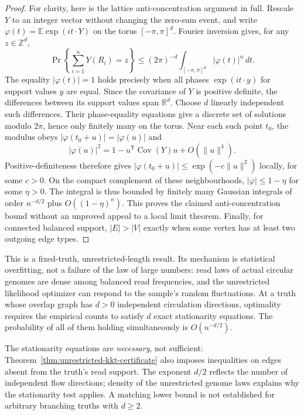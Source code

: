 \begin{proof}
For clarity, here is the lattice anti-concentration argument in
full. Rescale $Y$ to an integer vector without changing the
zero-sum event, and write
$\varphi(t)=\mathbb E\exp(i t\cdot Y)$ on the torus
$[-\pi,\pi]^d$. Fourier inversion gives, for any
$z\in\mathbb Z^d$,
\[
 \Pr\!\left\{\sum_{i=1}^n Y(R_i)=z\right\}
 \le (2\pi)^{-d}\int_{[-\pi,\pi]^d}|\varphi(t)|^n\,dt.
\]
The equality $|\varphi(t)|=1$ holds precisely when all
phases $\exp(i t\cdot y)$ for support values $y$ are equal.
Since the covariance of $Y$ is positive definite, the
differences between its support values span $\mathbb R^d$.
Choose $d$ linearly independent such differences. Their
phase-equality equations give a discrete set of solutions
modulo $2\pi$, hence only finitely many on the torus.
Near each such point $t_0$, the modulus obeys
$|\varphi(t_0+u)|=|\varphi(u)|$ and
\[
 |\varphi(u)|^2=1-u^{\mathsf T}\operatorname{Cov}(Y)u
                 +O(\|u\|^4).
\]
Positive-definiteness therefore gives
$|\varphi(t_0+u)|\le\exp(-c\|u\|^2)$ locally, for
some $c>0$. On the compact complement of these
neighbourhoods, $|\varphi|\le1-\eta$ for some $\eta>0$.
The integral is thus bounded by finitely many Gaussian
integrals of order $n^{-d/2}$ plus $O((1-\eta)^n)$.
This proves the claimed anti-concentration bound without
an unproved appeal to a local limit theorem.
Finally, for connected balanced support, $|E|>|V|$ exactly
when some vertex has at least two outgoing edge types.
\end{proof}

This is a fixed-truth, unrestricted-length result. Its mechanism
is statistical overfitting, not a failure of the law of large
numbers: read laws of actual circular genomes are dense among
balanced read frequencies, and the unrestricted likelihood
optimizer can respond to the sample's random fluctuations.
At a truth whose overlap graph has $d>0$ independent circulation
directions, optimality requires the empirical counts to satisfy
$d$ exact stationarity equations. The probability of all of
them holding simultaneously is $O(n^{-d/2})$.

The stationarity equations are \emph{necessary}, not sufficient:
Theorem~\ref{thm:unrestricted-kkt-certificate} also imposes
inequalities on edges absent from the truth's read support.
The exponent $d/2$ reflects the number of independent
flow directions; density of the unrestricted genome laws
explains why the stationarity test applies. A matching
lower bound is not established for arbitrary branching
truths with $d\ge2$.

